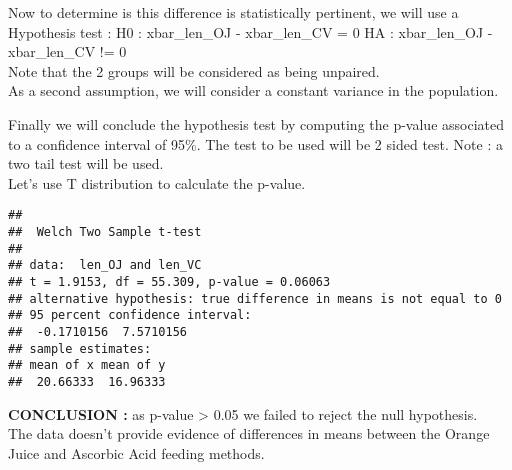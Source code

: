 \documentclass[
]{article}
\newenvironment{Shaded}{\begin{snugshade}}{\end{snugshade}}
\newcommand{\CommentTok}[1]{\textcolor[rgb]{0.56,0.35,0.01}{\textit{#1}}}
\newcommand{\DataTypeTok}[1]{\textcolor[rgb]{0.13,0.29,0.53}{#1}}
\newcommand{\DecValTok}[1]{\textcolor[rgb]{0.00,0.00,0.81}{#1}}
\newcommand{\FloatTok}[1]{\textcolor[rgb]{0.00,0.00,0.81}{#1}}
\newcommand{\KeywordTok}[1]{\textcolor[rgb]{0.13,0.29,0.53}{\textbf{#1}}}
\newcommand{\NormalTok}[1]{#1}
\newcommand{\OperatorTok}[1]{\textcolor[rgb]{0.81,0.36,0.00}{\textbf{#1}}}
\newcommand{\OtherTok}[1]{\textcolor[rgb]{0.56,0.35,0.01}{#1}}
\newcommand{\StringTok}[1]{\textcolor[rgb]{0.31,0.60,0.02}{#1}}
\begin{document}
Now to determine is this difference is statistically pertinent, we will
use a Hypothesis test : H0 : xbar\_len\_OJ - xbar\_len\_CV = 0 HA :
xbar\_len\_OJ - xbar\_len\_CV != 0\\
Note that the 2 groups will be considered as being unpaired.\\
As a second assumption, we will consider a constant variance in the
population.

Finally we will conclude the hypothesis test by computing the p-value
associated to a confidence interval of 95\%. The test to be used will be
2 sided test. Note : a two tail test will be used.\\
Let's use T distribution to calculate the p-value.

\begin{Shaded}
\end{Shaded}

\begin{verbatim}
## 
##  Welch Two Sample t-test
## 
## data:  len_OJ and len_VC
## t = 1.9153, df = 55.309, p-value = 0.06063
## alternative hypothesis: true difference in means is not equal to 0
## 95 percent confidence interval:
##  -0.1710156  7.5710156
## sample estimates:
## mean of x mean of y 
##  20.66333  16.96333
\end{verbatim}

\textbf{CONCLUSION :} as p-value \textgreater{} 0.05 we failed to reject
the null hypothesis.\\
The data doesn't provide evidence of differences in means between the
Orange Juice and Ascorbic Acid feeding methods.
\end{document}
